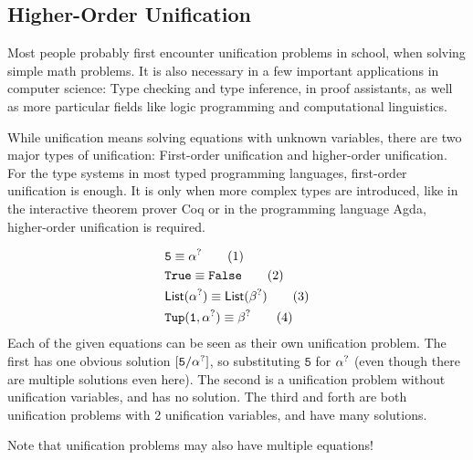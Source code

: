 \documentclass[twoside,12pt,a4paper]{article}
\begin{document}
\subsection{Higher-Order Unification}
Most people probably first encounter unification problems in school, when solving simple math problems.
It is also necessary in a few important applications in computer science: 
Type checking and type inference, in proof assistants, as well as more particular fields like logic programming and computational linguistics.

While unification means solving equations with unknown variables, there are two major types of unification: First-order unification and higher-order unification.
For the type systems in most typed programming languages, first-order unification is enough. It is only when more complex types are introduced, 
like in the interactive theorem prover Coq or in the programming language Agda, higher-order unification is required.

\begin{example}
    \begin{align*}
        &\mathtt{5} \equiv \alpha^?\tag{1}\\
        &\mathtt{True \equiv False}\tag{2}\\
        &\mathsf{List(\alpha^?)\equiv List(\beta^?)}\tag{3}\\
        &\mathtt{Tup(1,\alpha^?)}\equiv \beta^? \tag{4}
    \end{align*}
    Each of the given equations can be seen as their own unification problem.
    The first has one obvious solution $[\mathtt{5/\alpha^?}]$, so substituting $\mathtt{5}$ for $\alpha^?$ (even though there are multiple solutions even here).
    The second is a unification problem without unification variables, and has no solution.
    The third and forth are both unification problems with 2 unification variables, and have many solutions.
\end{example}
Note that unification problems may also have multiple equations!
\end{document}
